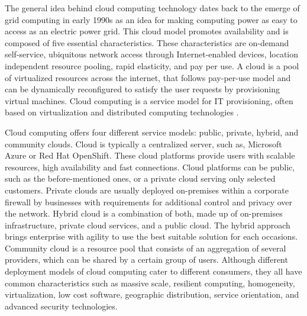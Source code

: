 The general idea behind cloud computing technology dates back to the emerge of grid computing in early 1990s as an idea for making computing power as easy to access as an electric power grid. This cloud model promotes availability and is composed of five essential characteristics. These characteristics are on-demand self-service, ubiquitous network access through Internet-enabled devices, location independent resource pooling, rapid elasticity, and pay per use. A cloud is a pool of virtualized resources across the internet, that follows pay-per-use model and can be dynamically reconfigured to satisfy the user requests by provisioning virtual machines. Cloud computing is a service model for IT provisioning, often based on virtualization and distributed computing technologies \cite{Lombardi2011}. \cite{Xing2012}

Cloud computing offers four different service models: public, private, hybrid, and community clouds. Cloud is typically a centralized server, such as, Microsoft Azure or Red Hat OpenShift. These cloud platforms provide users with scalable resources, high availability and fast connections. Cloud platforms can be public, such as the before-mentioned ones, or a private cloud serving only selected customers. Private clouds are usually deployed on-premises within a corporate firewall by businesses with requirements for additional control and privacy over the network. Hybrid cloud is a combination of both, made up of on-premises infrastructure, private cloud services, and a public cloud. The hybrid approach brings enterprise with agility to use the best suitable solution for each occasions. \cite{NetApp} Community cloud is a resource pool that consists of an aggregation of several providers, which can be shared by a certain group of users. Although different deployment models of cloud computing cater to different consumers, they all have common characteristics such as massive scale, resilient computing, homogeneity, virtualization, low cost software, geographic distribution, service orientation, and advanced security technologies. \cite{MicrosoftAzure}\cite{Taleb2017}\cite{Xing2012}







